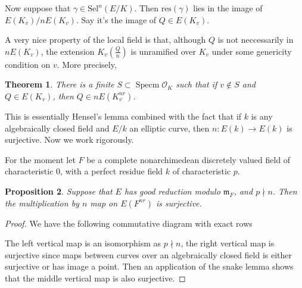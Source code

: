 \documentclass{article}
\newtheorem{thm}{Theorem}
\newtheorem{prop}[thm]{Proposition}
\newcommand{\ord}{\mathcal{O}}
\DeclareMathOperator{\spec}{Specm}
\begin{document}
Now suppose that $ \gamma\in \mathrm{Sel}^{n}(E/K) $.
Then $ \mathrm{res}(\gamma) $ lies in the image of $ E (K _{v})/n E (K _{v}) $.
Say it's the image of $ Q\in E (K _{v}) $.

A very nice property of the local field is that,
although $ Q $ is not neccessarily in $ n E (K _{v}) $,
the extension $ K _{v}\left(\frac{Q}{n}\right) $ is unramified over $ K _{v} $
under some genericity condition on $ v $.
More precisely,

\begin{thm}
There is a finite $ S\subset \spec \ord _{K} $ such that
if $ v\not\in S $ and $ Q\in E (K _{v}) $,
then $ Q\in n E (K _{v}^{nr}) $.
\end{thm}

This is essentially Hensel's lemma combined with the fact that
if $ k $ is any algebraically closed field and
$ E/k $ an elliptic curve,
then $ n: E (k)\to E (k) $ is surjective.
Now we work rigorously.

For the moment let $ F $ be a 
complete nonarchimedean discretely valued field of characteristic $ 0 $,
with a perfect residue field $ k $ of characteristic $ p $.

\begin{prop}
Suppose that $ E $ has good reduction modulo $ \mathfrak{m}_{F} $,
and $ p\nmid n $.
Then the multiplication by $ n $ map on $ E (F ^{nr}) $ is surjective.
\end{prop}

\begin{proof}
We have the following commutative diagram with exact rows
\begin{figure}[H]
\centering
{}
\end{figure}
The left vertical map is an isomorphism as $ p\nmid n $,
the right vertical map is surjective since maps between curves over an algebraically closed
field is either surjective or has image a point.
Then an application of the snake lemma shows that the middle vertical map is also surjective.
\end{proof}
\end{document}
